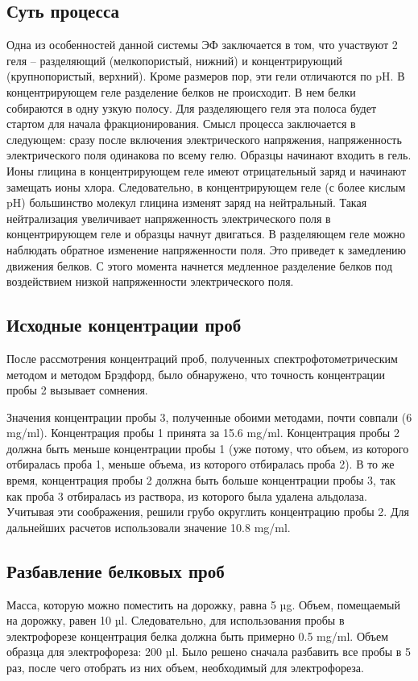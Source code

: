 \subsection{Суть процесса}

Одна из особенностей данной системы ЭФ заключается в том, что участвуют 2 геля --
разделяющий (мелкопористый, нижний) и концентрирующий (крупнопористый, верхний). Кроме размеров
пор, эти гели отличаются по pH. В концентрирующем геле разделение белков не происходит. В нем белки
собираются в одну узкую полосу. Для разделяющего геля эта полоса будет стартом для начала
фракционирования. Смысл процесса заключается в следующем: сразу после включения электрического
напряжения, напряженность электрического поля одинакова по всему гелю. Образцы начинают входить
в гель. Ионы глицина в концентрирующем геле имеют отрицательный заряд и начинают замещать ионы
хлора. Следовательно, в концентрирующем геле (с более кислым pH) большинство молекул глицина
изменят заряд на нейтральный. Такая нейтрализация увеличивает напряженность электрического
поля в концентрирующем геле и образцы начнут двигаться. В разделяющем геле можно наблюдать обратное
изменение напряженности поля. Это приведет к замедлению движения белков.
С этого момента начнется медленное разделение белков под воздействием низкой напряженности
электрического поля.


\subsection{Исходные концентрации проб}
После рассмотрения концентраций проб, полученных спектрофотометрическим методом
и методом Брэдфорд, было обнаружено, что точность концентрации пробы 2 вызывает
сомнения.

Значения концентрации пробы 3, полученные обоими методами, почти совпали (6 mg/ml).
Концентрация пробы 1 принята за 15.6 mg/ml.
Концентрация пробы 2 должна быть меньше концентрации пробы 1
(уже потому, что объем, из которого отбиралась проба 1,
меньше объема, из которого отбиралась проба 2).
В то же время, концентрация пробы 2 должна быть больше концентрации пробы 3,
так как проба 3 отбиралась из раствора, из которого была удалена альдолаза.
Учитывая эти соображения, решили грубо округлить концентрацию пробы 2.
Для дальнейших расчетов использовали значение 10.8 mg/ml.

\subsection{Разбавление белковых проб}
Масса, которую можно поместить на дорожку, равна 5 µg.
Объем, помещаемый на дорожку, равен 10 µl.
Следовательно, для использования пробы в электрофорезе концентрация
белка должна быть примерно 0.5 mg/ml.
Объем образца для электрофореза: 200 µl.
Было решено сначала разбавить все пробы в 5 раз, после чего
отобрать из них объем, необходимый для электрофореза.

